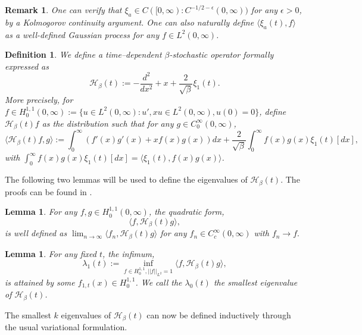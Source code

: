 \documentclass{amsart}
\newtheorem{lm}[thm]{Lemma}
\newtheorem{defn}[thm]{Definition}
\newtheorem{rmk}[thm]{Remark}
\numberwithin{equation}{section}
\newcommand{\la}{\langle}
\newcommand{\ra}{\rangle}
\begin{document}
\begin{rmk}
    One can verify that $\xi_{a} \in C([0,\infty):C^{-1/2-\epsilon}(0,\infty))$ for any $\epsilon>0$, by a Kolmogorov continuity argument. One can also naturally define $\la \xi_a(t), f \ra$ as a well-defined Gaussian process for any $f \in L^2(0,\infty)$.
\end{rmk}


\begin{defn}
    We define a time--dependent $\beta$-stochastic operator formally expressed as
    \begin{equation}
        \mathcal{H}_{\beta}(t) := -\frac{d^2}{dx^2}+x+\frac{2}{\sqrt{\beta}}\xi_1(t).
    \end{equation}
    More precisely, for $f \in H^{1,1}_{0}(0,\infty):= \{u \in L^2(0,\infty): u',xu \in L^2(0,\infty), u(0)=0\}$, define $\mathcal{H}_{\beta}(t)f$ as the distribution such that for any $g \in C_0^{\infty}(0,\infty)$,
    \begin{equation}
        \la \mathcal{H}_{\beta}(t) f,  g \ra := \int_{0}^{\infty} (f'(x) g'(x)+xf(x)g(x))dx+\frac{2}{\sqrt{\beta}}\int_{0}^{\infty} f(x)g(x) \xi_1(t)[dx],
    \end{equation}
    with $\int_{0}^{\infty} f(x)g(x) \xi_1(t)[dx] = \la \xi_1(t), f(x)g(x) \ra$.
\end{defn}
The following two lemmas will be used to define the eigenvalues of $\mathcal{H}_{\beta}(t)$. The proofs can be found in \cite{ramirez2011beta}.
\begin{lm}
    For any $f, g\in H_0^{1,1}(0,\infty)$, the quadratic form,
    \begin{equation}
        \la f, \mathcal{H}_{\beta}(t) g\ra,
    \end{equation}
    is well defined as $\lim_{n \to \infty } \la f_n, \mathcal{H}_{\beta}(t) g\ra$ for any $f_n \in C_c^{\infty}(0,\infty)$ with $f_n \to f.$
\end{lm}

\begin{lm}
    For any fixed $t$, the infimum,
    \begin{equation}
        \lambda_1(t):=\inf_{f \in H_0^{1,1}, ||f||_{L^2}=1} \la f, \mathcal{H}_{\beta}(t) g\ra,
    \end{equation}
    is attained by some $f_{1,t}(x) \in H_0^{1,1}$. We call the $\lambda_0(t)$ the smallest eigenvalue of $\mathcal{H}_{\beta}(t)$.
\end{lm}

The smallest $k$ eigenvalues of $\mathcal{H}_{\beta}(t)$ can now be defined inductively through the usual variational formulation. 
\end{document}
